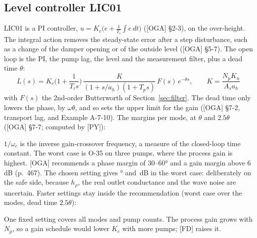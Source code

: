 \documentclass[11pt]{article}
\begin{document}
\subsection{Level controller LIC01}
LIC01 is a PI controller, $u = K_c\big(e + \frac{1}{T_i}\int e\,dt\big)$ ([OGA] §2-3), on the
over-height. The integral action removes the steady-state error after a step disturbance, such as
a change of the damper opening or of the outside level ([OGA] §5-7). The open loop is the PI, the
pump lag, the level and the measurement filter, plus a dead time $\theta$:
\begin{equation}
L(s) = K_c\Big(1+\frac{1}{T_is}\Big)\,\frac{K}{(1+s/a_h)(1+T_ps)}\,F(s)\,e^{-\theta s},
\qquad K = \frac{N_pK_n}{A_s a_h}
\end{equation}
with $F(s)$ the 2nd-order Butterworth of Section~\ref{sec:filter}. The dead time only lowers the
phase, by $\omega\theta$, and so sets the upper limit for the gain ([OGA] §7-2, transport lag,
and Example A-7-10). The margins per mode, at $\theta$ and $2.5\theta$
([OGA] §7-7; computed by [PY]):
\begin{center}

\end{center}
$1/\omega_c$ is the inverse gain-crossover frequency, a measure of the closed-loop time constant.
The worst case is O-35 on three pumps, where the process gain is highest. [OGA] recommends a phase
margin of 30--60° and a gain margin above 6\,dB (p.~467). The chosen setting gives
\CASLicPM° and \CASLicGM\,dB in the worst case: deliberately on the safe side, because $h_\rho$,
the real outlet conductance and the wave noise are uncertain. Faster settings stay inside the
recommendation (worst case over the modes, dead time $2.5\theta$):
\begin{center}

\end{center}
One fixed setting covers all modes and pump counts. The process gain grows with $N_p$, so a gain
schedule would lower $K_c$ with more pumps; [FD] raises it.
\end{document}
